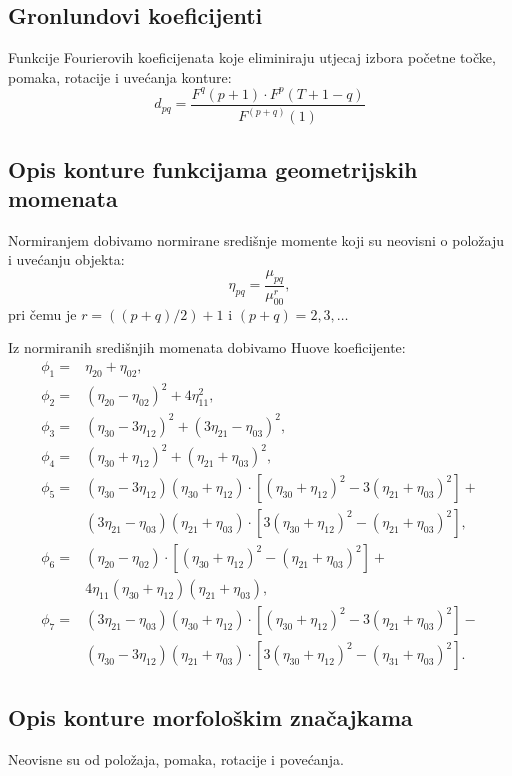 \documentclass[11pt,english]{article}
\begin{document}
\subsection{Gronlundovi koeficijenti}
Funkcije Fourierovih koeficijenata koje eliminiraju utjecaj izbora početne točke, pomaka, rotacije i uvećanja konture:
$$d_{pq} = \dfrac{F^q(p+1)\cdot F^p(T+1-q)}{F^{(p+q)}(1)}$$

\subsection{Opis konture funkcijama geometrijskih momenata}
Normiranjem dobivamo normirane središnje momente koji su neovisni o položaju i uvećanju objekta:
$$\eta_{pq} = \dfrac{\mu_{pq}}{\mu^r_{00}},$$
pri čemu je $r = ((p+q)/2)+1$ i $(p+q) = 2, 3, \ldots$

Iz normiranih središnjih momenata dobivamo Huove koeficijente:
\begin{align*}
\phi_1 = &\eta_{20} + \eta_{02},\\
\phi_2 = &(\eta_{20} - \eta_{02})^2 + 4\eta_{11}^2,\\
\phi_3 = &(\eta_{30} - 3\eta_{12})^2 + (3\eta_{21} - \eta_{03})^2,\\
\phi_4 = &(\eta_{30} + \eta_{12})^2 + (\eta_{21} + \eta_{03})^2,\\
\phi_5 = &(\eta_{30} -3\eta_{12})(\eta_{30} + \eta_{12}) \cdot
[(\eta_{30} + \eta_{12})^2-3(\eta_{21} + \eta_{03})^2]+\\
&(3\eta_{21}-\eta_{03})(\eta_{21} + \eta_{03}) \cdot
[3(\eta_{30} + \eta_{12})^2 - (\eta_{21} + \eta_{03})^2],\\
\phi_6 = &(\eta_{20} - \eta_{02}) \cdot
[(\eta_{30} + \eta_{12})^2- (\eta_{21} + \eta_{03})^2]+\\
&4\eta_{11}(\eta_{30} + \eta_{12})(\eta_{21} + \eta_{03}),\\
\phi_7 = &(3\eta_{21} - \eta_{03})(\eta_{30} + \eta_{12}) \cdot
[(\eta_{30} + \eta_{12})^2-3(\eta_{21} + \eta_{03})^2]-\\
&(\eta_{30}-3\eta_{12})(\eta_{21} + \eta_{03}) \cdot
[3(\eta_{30} + \eta_{12})^2 - (\eta_{31} + \eta_{03})^2].
\end{align*}

\subsection{Opis konture morfološkim značajkama}
Neovisne su od položaja, pomaka, rotacije i povećanja.
\end{document}

